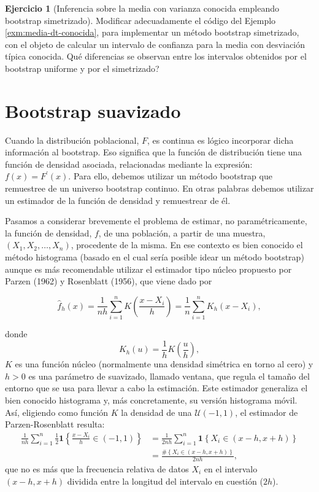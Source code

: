 \documentclass[
]{book}
\theoremstyle{break}
\theoremstyle{definition}
\theoremstyle{definition}
\theoremstyle{definition}
\newtheorem{exercise}{Ejercicio}[chapter]
\theoremstyle{remark}
\begin{document}
\begin{exercise}[Inferencia sobre la media con varianza conocida empleando bootstrap simetrizado]
\protect\hypertarget{exr:media-dt-conocida-sim}{}{\label{exr:media-dt-conocida-sim} \iffalse (Inferencia sobre la media con varianza conocida empleando bootstrap simetrizado) \fi{} }
Modificar adecuadamente el código del Ejemplo \ref{exm:media-dt-conocida}, para
implementar un método bootstrap simetrizado, con el objeto de calcular
un intervalo de confianza para la media con desviación típica conocida.
Qué diferencias se observan entre los intervalos obtenidos por el
bootstrap uniforme y por el simetrizado?
\end{exercise}

\hypertarget{modunif-boot-suav}{%
\section{Bootstrap suavizado}\label{modunif-boot-suav}}

Cuando la distribución poblacional, \(F\), es continua es lógico
incorporar dicha información al bootstrap. Eso significa que la función
de distribución tiene una función de densidad asociada, relacionadas
mediante la expresión: \(f\left( x \right) =F^{\prime}\left( x \right)\). Para ello, debemos utilizar un método bootstrap que
remuestree de un universo bootstrap continuo. En otras palabras debemos
utilizar un estimador de la función de densidad y remuestrear de él.

Pasamos a considerar brevemente el problema de estimar, no
paramétricamente, la función de densidad, \(f\), de una población, a
partir de una muestra, \(\left( X_1,X_2,\ldots ,X_n \right)\),
procedente de la misma. En ese contexto es bien conocido el método
histograma (basado en el cual sería posible idear un método bootstrap)
aunque es más recomendable utilizar el estimador tipo núcleo propuesto
por Parzen (1962) y Rosenblatt (1956), que viene dado por

\[\hat{f}_{h}\left( x \right) =\frac{1}{nh}\sum_{i=1}^{n}K\left( \frac{x-X_i}{
h} \right) =\frac{1}{n}\sum_{i=1}^{n}K_{h}\left( x-X_i \right),\]

donde
\[K_{h}\left( u \right) =\frac{1}{h}K\left( \frac{u}{h} \right),\]
\(K\) es una función núcleo (normalmente una densidad simétrica en torno
al cero) y \(h>0\) es una parámetro de suavizado, llamado ventana, que
regula el tamaño del entorno que se usa para llevar a cabo la
estimación. Este estimador generaliza el bien conocido histograma y, más
concretamente, su versión histograma móvil. Así, eligiendo como función
\(K\) la densidad de una \(\mathcal{U}\left( -1,1 \right)\), el estimador de
Parzen-Rosenblatt resulta:
\[\begin{aligned}
\frac{1}{nh}\sum_{i=1}^{n}\frac{1}{2}\mathbf{1}\left\{ \frac{x-X_i}{h}\in
\left( -1,1 \right) \right\} &= \frac{1}{2nh}\sum_{i=1}^{n}\mathbf{1}\left\{
X_i\in \left( x-h,x+h \right) \right\} \\
&= \frac{\#\left\{ X_i\in \left( x-h,x+h \right) \right\} }{2nh},
\end{aligned}\]
que no es más que la frecuencia relativa de datos \(X_i\) en el
intervalo \(\left( x-h,x+h \right)\) dividida entre la longitud del
intervalo en cuestión (\(2h\)).
\end{document}
